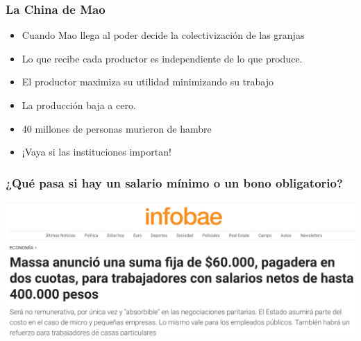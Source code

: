 \documentclass{beamer}
\begin{document}
\begin{frame}
\frametitle{La China de Mao }
\begin{itemize}
    \item Cuando Mao llega al poder decide la colectivización de las granjas
    \item Lo que recibe cada productor es independiente de lo que produce. 
    
    \item El productor maximiza su utilidad minimizando su trabajo 
     \item La producción baja a cero.  
     \item 40 millones de personas murieron de hambre
     \item ¡Vaya si las instituciones importan! 
\end{itemize}

\end{frame}

\begin{frame}
\frametitle{¿Qué pasa si hay un salario mínimo o un bono obligatorio?}
\centering
\includegraphics[scale=0.33]{../Figures/InstitucionesBono.png}
\end{frame}
\end{document}
